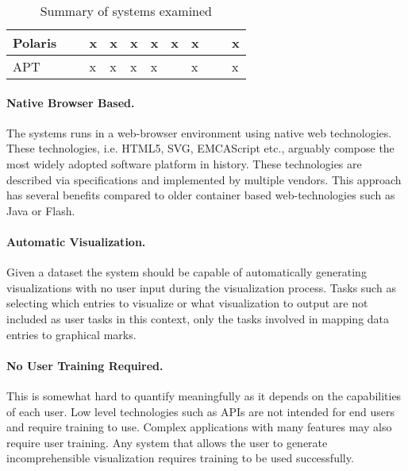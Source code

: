 \documentclass[a4paper, 11pt, titlepage, onehalfspacing]{report}
\begin{document}
\begin{sidewaystable}
\begin{tabularx}{\textwidth}{>{\centering}X|>{\centering}X|>{\centering}X|>{\centering}X|>{\centering}X|>{\centering}X|>{\centering}X|>{\centering}X|>{\centering}X|>{\centering\arraybackslash}X}
    Polaris           & ~                    & x                       & x                         & x                   & x                              & x           & x                               & ~                      & x                             \\ \hline
    APT               & ~                    & x                       & x                         & x                   & x                              & ~           & x                               & ~                      & x                             \\ 
 \end{tabularx}
\caption{Summary of systems examined}
\label{feature_matrix}
\end{sidewaystable} 
\label{project_goals}
\paragraph{Native Browser Based.} The systems runs in a web-browser environment using native web technologies. These technologies, i.e. HTML5, SVG, EMCAScript etc., arguably compose the most widely adopted software platform in history. These technologies are described via specifications and implemented by multiple vendors. This approach has several benefits compared to older container based web-technologies such as Java or Flash.

\paragraph{Automatic Visualization.} Given a dataset the system should be capable of automatically generating visualizations with no user input during the visualization process. Tasks such as selecting which entries to visualize or what visualization to output are not included as user tasks in this context, only the tasks involved in mapping data entries to graphical marks.

\paragraph{No User Training Required.}
This is somewhat hard to quantify meaningfully as it depends on the capabilities of each user. Low level technologies such as APIs are not intended for end users and require training to use. Complex applications with many features may also require user training. Any system that allows the user to generate incomprehensible visualization requires training to be used successfully.
\end{document}

